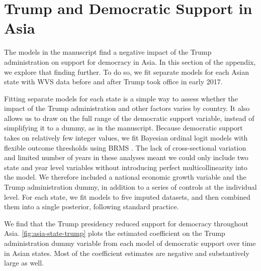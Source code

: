 \documentclass[12pt]{article}
\begin{document}
\newpage 

\section{Trump and Democratic Support in Asia}

The models in the manuscript find a negative impact of the Trump administration on support for democracy in Asia. 
In this section of the appendix, we explore that finding further. 
To do so, we fit separate models for each Asian state with WVS data before and after Trump took office in early 2017. 


Fitting separate models for each state is a simple way to assess whether the impact of the Trump administration and other factors varies by country. 
It also allows us to draw on the full range of the democratic support variable, instead of simplifying it to a dummy, as in the manuscript. 
Because democratic support takes on relatively few integer values, we fit Bayesian ordinal logit models with flexible outcome thresholds using BRMS \citep{Buerkner2017}.
The lack of cross-sectional variation and limited number of years in these analyses meant we could only include two state and year level variables without introducing perfect multicollinearity into the model. 
We therefore included a national economic growth variable and the Trump administration dummy, in addition to a series of controls at the individual level. 
For each state, we fit models to five imputed datasets, and then combined them into a single posterior, following standard practice. 


We find that the Trump presidency reduced support for democracy throughout Asia. 
\autoref{fig:asia-state-trump} plots the estimated coefficient on the Trump administration dummy variable from each model of democratic support over time in Asian states. 
Most of the coefficient estimates are negative and substantively large as well. 
\end{document}
